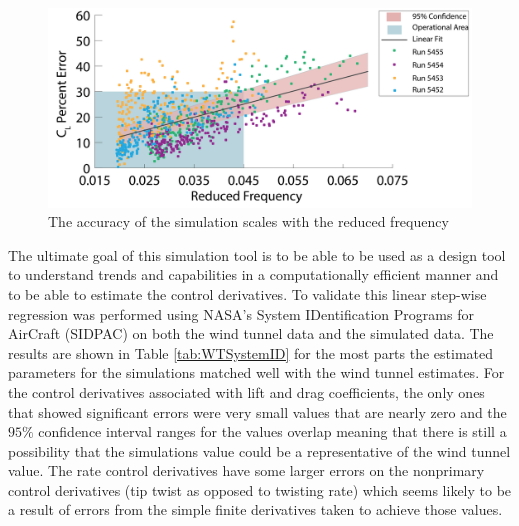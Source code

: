 \documentclass[11pt]{ucthesis}
\begin{document}
\begin{figure}[thpb]
\centering
\includegraphics[width=.75\linewidth]{Figures/ReducedFreqvCLPError-01.png}
\caption{The accuracy of the simulation scales with the reduced frequency}
\label{fig:RFreqvCLEr}
\end{figure}

The ultimate goal of this simulation tool is to be able to be used as a design tool to understand trends and capabilities in a computationally efficient manner and to be able to estimate the control derivatives. To validate this linear step-wise regression was performed using NASA's System IDentification Programs for AirCraft (SIDPAC) \cite{klein2006aircraft} on both the wind tunnel data and the simulated data. The results are shown in Table \ref{tab:WTSystemID} for the most parts the estimated parameters for the simulations matched well with the wind tunnel estimates. For the control derivatives associated with lift and drag coefficients, the only ones that showed significant errors were very small values that are nearly zero and the $95\%$ confidence interval ranges for the values overlap meaning that there is still a possibility that the simulations value could be a representative of the wind tunnel value. The rate control derivatives have some larger errors on the nonprimary control derivatives (tip twist as opposed to twisting rate) which seems likely to be a result of errors from the simple finite derivatives taken to achieve those values.
\end{document}
